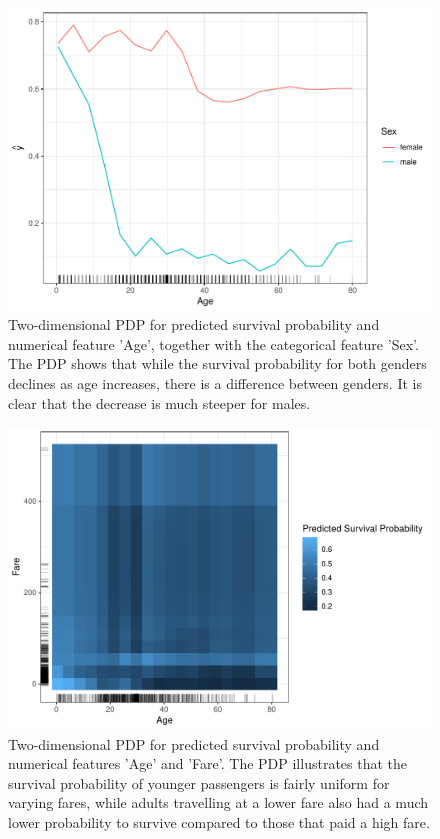 \documentclass[]{krantz}
\begin{document}
\begin{figure}

{\centering \includegraphics[width=0.8\linewidth]{images/PDP_Plot_3} 

}

\caption{Two-dimensional PDP for predicted survival probability and numerical feature 'Age', together with the categorical feature 'Sex'. The PDP shows that while the survival probability for both genders declines as age increases, there is a difference between genders. It is clear that the decrease is much steeper for males.}\label{fig:plot3}
\end{figure}

\begin{figure}

{\centering \includegraphics[width=0.8\linewidth]{images/PDP_Plot_4} 

}

\caption{Two-dimensional PDP for predicted survival probability and numerical features 'Age' and 'Fare'. The PDP illustrates that the survival probability of younger passengers is fairly uniform for varying fares, while adults travelling at a lower fare also had a much lower probability to survive compared to those that paid a high fare.}\label{fig:plot4}
\end{figure}
\end{document}
